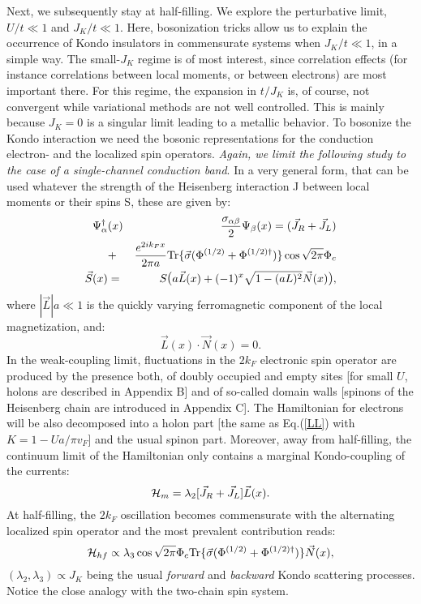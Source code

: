 Next, we subsequently stay at half-filling.
We explore the perturbative limit, $U/t\ll 1$ and
$J_K/t\ll 1$. Here, 
bosonization tricks allow us to explain the occurrence of Kondo 
insulators in commensurate systems when $J_K/t\ll 1$, in a simple way. 
\vskip 0.2cm
The small-$J_K$ regime
is of most interest, since correlation effects 
(for
instance correlations between local moments, or between electrons) 
are most important there.
For this regime, the expansion in $t/J_K$ is, of course, not convergent while
variational methods are not well controlled. This is mainly because 
$J_K=0$ is a singular limit leading to a metallic behavior. 
\vskip 0.2cm
To bosonize the Kondo interaction we need the bosonic representations for the
conduction electron- and the localized spin operators. \emph{Again, 
we limit the following study to the case of a single-channel conduction
band}. In a very general form, that can be used whatever the strength of
the Heisenberg interaction J between local moments or their spins S, these
are given by\cite{Affleck_boso}:
\begin{eqnarray}
\Psi^{\dag}_{\alpha}&(x)&\frac{{\sigma}_{\alpha\beta}}{2}\Psi_{\beta}(x)=
(\vec{J}_{R}+\vec{J}_{L})\\ \nonumber
&+&
\frac{e^{2ik_Fx}}{2\pi
a}\hbox{Tr}\{\vec{\sigma}(\Phi^{(1/2)}+\Phi^{(1/2)\dag})\}\cos{\sqrt{2\pi}
\Phi_c}\\ \nonumber
\vec{S}(x)&=&S\hbox{\large(}a\vec{L}(x)+(-1)^x
\sqrt{1-(a{L})^2}\vec{N}(x)\hbox{\large)},
\end{eqnarray}
where $|\vec{L}|a\ll 1$ is the quickly varying ferromagnetic component of the
local magnetization, and:
\begin{equation}
\vec{L}(x)\cdot\vec{N}(x)=0. 
\end{equation}
In the weak-coupling limit, fluctuations
in the $2k_F$ electronic spin operator are produced by the presence both, of
doubly occupied and empty sites [for small $U$, holons are
described in Appendix B] and of so-called
domain walls [spinons of the Heisenberg chain 
are introduced in Appendix C].
The Hamiltonian for electrons will be also decomposed into a holon
part [the same as Eq.(\ref{LL}) with $K=1-Ua/\pi v_F$] and the usual
spinon part. 
\vskip 0.15cm
Moreover, 
away from half-filling, the continuum limit
of the Hamiltonian only contains a marginal Kondo-coupling of the 
currents\cite{Affleck}:
\begin{equation}
\label{forward}
{\cal H}_{m}=\lambda_2[\vec{J}_{R}+\vec{J}_{L}]\vec{L}(x).
\end{equation}
At half-filling, the $2k_F$ oscillation becomes commensurate with the
alternating localized spin operator and the most prevalent contribution
reads:
\begin{equation}
\label{backward}
{\cal H}_{hf}\propto\lambda_3\cos{\sqrt{2\pi}
\Phi_c}
\hbox{Tr}\{\vec{\sigma}(\Phi^{(1/2)}+\Phi^{(1/2)\dag})\}\vec{N}(x),
\end{equation}
$(\lambda_2, \lambda_3)\propto J_K$ being the usual {\it forward} and 
{\it backward} Kondo scattering processes. Notice
 the close analogy with the two-chain spin system\cite{Dagotto-Rice}.

